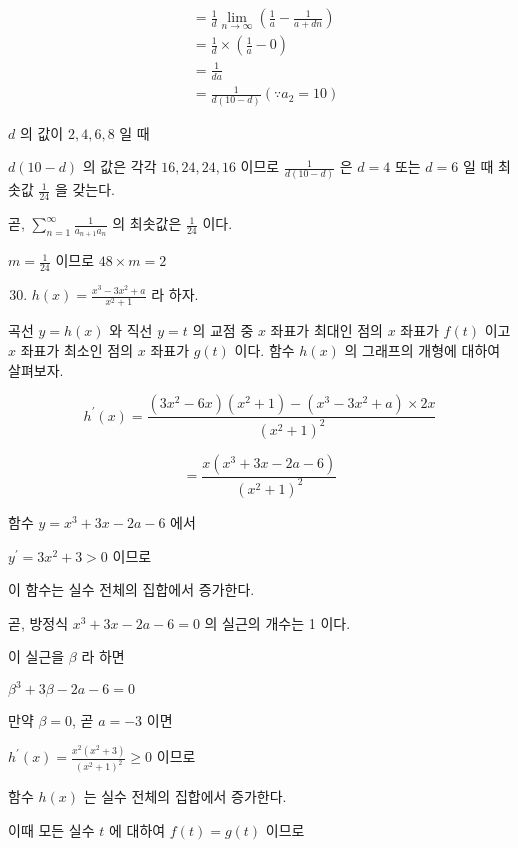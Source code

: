 \documentclass[10pt]{article}
\begin{document}
\[
\begin{aligned}
& =\frac{1}{d} \lim _{n \rightarrow \infty}\left(\frac{1}{a}-\frac{1}{a+d n}\right) \\
& =\frac{1}{d} \times\left(\frac{1}{a}-0\right) \\
& =\frac{1}{d a} \\
& =\frac{1}{d(10-d)}\left(\because a_{2}=10\right)
\end{aligned}
\]

\(d\) 의 값이 \(2,4,6,8\) 일 때

\(d(10-d)\) 의 값은 각각 \(16,24,24,16\) 이므로 \(\frac{1}{d(10-d)}\) 은 \(d=4\) 또는 \(d=6\) 일 때 최솟값 \(\frac{1}{24}\) 을 갖는다.

곧, \(\sum_{n=1}^{\infty} \frac{1}{a_{n+1} a_{n}}\) 의 최솟값은 \(\frac{1}{24}\) 이다.

\(m=\frac{1}{24}\) 이므로 \(48 \times m=2\)

\begin{enumerate}
  \setcounter{enumi}{29}
  \item \(h(x)=\frac{x^{3}-3 x^{2}+a}{x^{2}+1}\) 라 하자.
\end{enumerate}

곡선 \(y=h(x)\) 와 직선 \(y=t\) 의 교점 중 \(x\) 좌표가 최대인 점의 \(x\) 좌표가 \(f(t)\) 이고 \(x\) 좌표가 최소인 점의 \(x\) 좌표가 \(g(t)\) 이다. 함수 \(h(x)\) 의 그래프의 개형에 대하여 살펴보자.

\[
h^{\prime}(x)=\frac{\left(3 x^{2}-6 x\right)\left(x^{2}+1\right)-\left(x^{3}-3 x^{2}+a\right) \times 2 x}{\left(x^{2}+1\right)^{2}}
\]

\[
=\frac{x\left(x^{3}+3 x-2 a-6\right)}{\left(x^{2}+1\right)^{2}}
\]

함수 \(y=x^{3}+3 x-2 a-6\) 에서

\(y^{\prime}=3 x^{2}+3>0\) 이므로

이 함수는 실수 전체의 집합에서 증가한다.

곧, 방정식 \(x^{3}+3 x-2 a-6=0\) 의 실근의 개수는 1 이다.

이 실근을 \(\beta\) 라 하면

\(\beta^{3}+3 \beta-2 a-6=0\)

만약 \(\beta=0\), 곧 \(a=-3\) 이면

\(h^{\prime}(x)=\frac{x^{2}\left(x^{2}+3\right)}{\left(x^{2}+1\right)^{2}} \geq 0\) 이므로

함수 \(h(x)\) 는 실수 전체의 집합에서 증가한다.

이때 모든 실수 \(t\) 에 대하여 \(f(t)=g(t)\) 이므로
\end{document}
